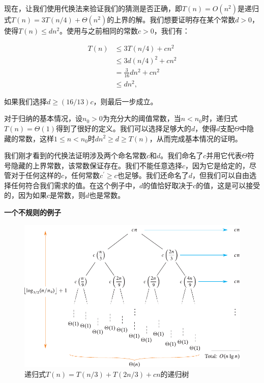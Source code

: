 \documentclass[lang=cn,newtx,10pt,scheme=chinese]{elegantbook}
\begin{document}
现在，让我们使用代换法来验证我们的猜测是否正确，即$T(n)=O\left(n^2\right)$是递归式$T(n)=3 T(n / 4)+\Theta\left(n^2\right)$的上界的解。我们想要证明存在某个常数$d>0$，使得$T(n) \leq d n^2$。使用与之前相同的常数$c>0$，我们有：

$$
\begin{aligned}
T(n) & \leq 3 T(n / 4)+c n^2 \\
& \leq 3 d(n / 4)^2+c n^2 \\
& =\frac{3}{16} d n^2+c n^2 \\
& \leq d n^2,
\end{aligned}
$$

如果我们选择$d \geq(16 / 13) c$，则最后一步成立。

对于归纳的基本情况，设$n_0>0$为充分大的阈值常数，当$n<n_0$时，递归式$T(n)=\Theta(1)$得到了很好的定义。我们可以选择足够大的$d$，使得$d$支配$\Theta$中隐藏的常数，这样$1 \leq n<n_0$时$d n^2 \geq d \geq T(n)$，从而完成基本情况的证明。

我们刚才看到的代换法证明涉及两个命名常数$c$和$d$。我们命名了$c$并用它代表$\Theta$符号隐藏的上界常数，该常数保证存在。我们不能任意选择$c$，因为它是给定的，尽管对于任何这样的$c$，任何常数$c^{\prime} \geq c$也足够。我们还命名了$d$，但我们可以自由选择任何符合我们需求的值。在这个例子中，$d$的值恰好取决于$c$的值，这是可以接受的，因为如果$c$是常数，则$d$也是常数。

\textbf{一个不规则的例子}

\begin{figure}
    \centering
    \includegraphics{算法导论第四版插图/第四章/4-2.pdf}
    \caption{递归式$T(n)=T(n / 3)+T(2 n / 3)+c n$的递归树}
    \label{fig:4-2}
\end{figure}
\end{document}
